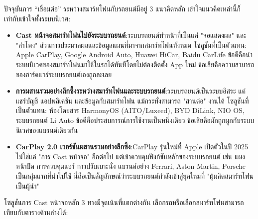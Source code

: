 


ปัจจุบันการ “เชื่อมต่อ” ระหว่างสมาร์ทโฟนกับรถยนต์มีอยู่ 3 แนวคิดหลัก เข้าใจแนวคิดเหล่านี้ก็เท่ากับเข้าใจทั้งระบบนิเวศ:

\begin{itemize}
  \item \textbf{Cast หน้าจอสมาร์ทโฟนไปยังระบบรถยนต์}:ระบบรถยนต์ทำหน้าที่เป็นแค่ "จอแสดงผล" และ "ลำโพง" ส่วนการประมวลผลและข้อมูลแผนที่มาจากสมาร์ทโฟนทั้งหมด โซลูชันที่เป็นตัวแทน: Apple CarPlay, Google Android Auto, Huawei HiCar, Baidu CarLife ข้อดีคือนำระบบนิเวศของสมาร์ทโฟนมาใช้ในรถได้ทันทีโดยไม่ต้องติดตั้ง App ใหม่ ข้อเสียคือความสามารถของฮาร์ดแวร์ระบบรถยนต์เองถูกละเลย
  \item \textbf{การผสานรวมอย่างลึกซึ้งระหว่างสมาร์ทโฟนและระบบรถยนต์}:ระบบรถยนต์เป็นระบบอิสระ แต่แชร์บัญชี แอปพลิเคชัน และข้อมูลกับสมาร์ทโฟน แม้กระทั่งสามารถ "สานต่อ" งานได้ โซลูชันที่เป็นตัวแทน: ห้องโดยสาร HarmonyOS (AITO/Luxeed), BYD DiLink, NIO OS, ระบบรถยนต์ Li Auto ข้อดีคือประสบการณ์การใช้งานเป็นหนึ่งเดียว ข้อเสียคือมักถูกผูกกับระบบนิเวศของแบรนด์เดียวกัน
  \item \textbf{CarPlay 2.0 เวอร์ชันผสานรวมอย่างลึกซึ้ง}:CarPlay รุ่นใหม่ที่ Apple เปิดตัวในปี 2025 ไม่ใช่แค่ "การ Cast หน้าจอ" อีกต่อไป แต่เข้าควบคุมฟังก์ชันหลักของระบบรถยนต์ เช่น แผงหน้าปัด การควบคุมแอร์ การปรับเบาะนั่ง แบรนด์อย่าง Ferrari, Aston Martin, Porsche เป็นกลุ่มแรกที่นำไปใช้ นี่ถือเป็นสัญลักษณ์ว่าระบบรถยนต์กำลังเข้าสู่ยุคใหม่ที่ "ผู้ผลิตสมาร์ทโฟนเป็นผู้นำ"
\end{itemize}


โซลูชันการ Cast หน้าจอหลัก 3 ทางมีจุดเน้นที่แตกต่างกัน เลือกรถหรือเลือกสมาร์ทโฟนสามารถเทียบกับตารางด้านล่างได้:

